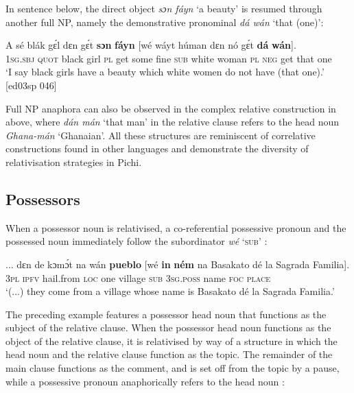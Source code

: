 In sentence  below, the direct object \textit{sɔn fáyn} ‘a beauty’ is resumed through another full NP, namely the demonstrative pronominal \textit{dá wán} ‘that (one)’:


\ea%
    \label{ex:key:1446}
    \gll A    sé    blák    gɛ́l  dɛn  gɛ́t  \textbf{sɔn}    \textbf{fáyn}
[wé  wáyt  húman  dɛn nó  gɛ́t  \textbf{dá}  \textbf{wán}].\\
\textsc{1sg.sbj}  \textsc{quot}    black  girl  \textsc{pl}  get  some  fine  
 \phantom{[}\textsc{sub}  white  woman  \textsc{pl}   \textsc{neg}  get  that  one\\

\glt ‘I say black girls have a beauty which white women do not 
have (that one).’ [ed03sp 046]
\z

Full \textsc{NP} anaphora can also be observed in the complex relative construction in  above, where \textit{dán mán} ‘that man’ in the relative clause refers to the head noun \textit{Ghana-mán} ‘Ghanaian’. All these structures are reminiscent of correlative constructions found in other languages and demonstrate the diversity of relativisation strategies in Pichi.

\subsection{Possessors}

When a possessor noun is relativised, a co-referential possessive pronoun and the possessed noun immediately follow the subordinator \textit{wé} ‘\textsc{sub}’ :


\ea%
    \label{ex:key:1447}
\gll
\op...\cp{}  dɛn  de  kɔmɔ́t    na  wán    \textbf{pueblo}  [wé    \textbf{in}    \textbf{ném}  na
{Basakato   dé la Sagrada Familia}].\\
{} \textsc{3pl}  \textsc{ipfv}  hail.from  \textsc{loc}  one    village   \phantom{[}\textsc{sub}    \textsc{3sg.poss}  name  \textsc{foc}
\textsc{place}\\

\glt ‘(...) they come from a village whose name is Basakato dé la Sagrada 
Familia.’\textstylePichiglossZchn{ [fr03ft 042]}
\z

The preceding example features a possessor head noun that functions as the subject of the relative clause. When the possessor head noun functions as the object of the relative clause, it is relativised by way of a structure in which the head noun and the relative clause function as the topic. The remainder of the main clause functions as the comment, and is set off from the topic by a pause, while a possessive pronoun anaphorically refers to the head noun :


